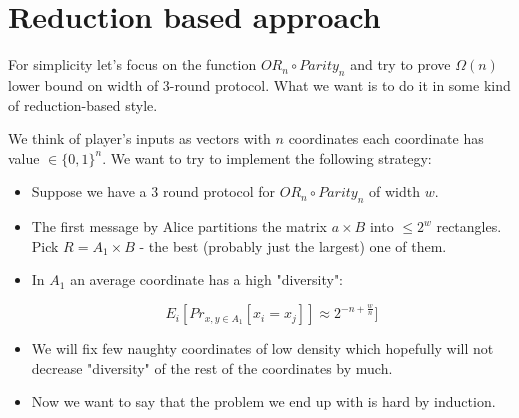 \section{Reduction based approach}

For simplicity let's focus on the function $OR_n \circ Parity_n$ and try to prove $\Omega(n)$ lower bound on width of $3$-round protocol. What we want is to do it in some kind of reduction-based style.

We think of player's inputs as vectors with $n$ coordinates each coordinate has value $\in \{0,1\}^n$. We want to try to implement the following strategy:

\begin{itemize}
    \item Suppose we have a $3$ round protocol for $OR_n \circ Parity_n$ of width $w$.
    
    \item The first message by Alice partitions the matrix $a \times B$ into $\leq 2^w$ rectangles. Pick $R = A_1 \times B$ - the best (probably just the largest) one of them.
    
    \item
    In $A_1$ an average coordinate has a high "diversity": 
    
    \[E_i[Pr_{x,y \in A_1}[x_i = x_j]] \approx 2^{-n + \frac{w}{n}} ] \]
    
    \item
    We will fix few naughty coordinates of low density which hopefully will not decrease "diversity" of the rest of the coordinates by much.
    \item
    Now we want to say that the problem we end up with is hard by induction.
    
    
    
\end{itemize}